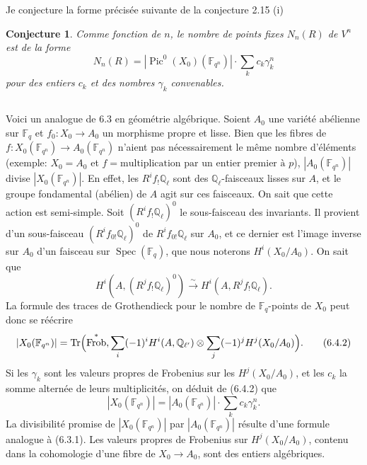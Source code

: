 \documentclass[11pt,a4paper]{article}
\theoremstyle{plain}
\newtheorem{conjecture}[theorem]{Conjecture}
\theoremstyle{definition}
\DeclareMathOperator{\Spec}{Spec}
\DeclareMathOperator{\Pic}{Pic}
\DeclareMathOperator{\Frob}{Frob}
\DeclareMathOperator{\Tr}{Tr}
\newcommand{\Q}{\mathbb{Q}}
\newcommand{\F}{\mathbb{F}}
\begin{document}
Je conjecture la forme pr\'ecis\'ee suivante de la conjecture 2.15 (i)

\begin{conjecture}
Comme fonction de $n$, le nombre de points fixes $N_n(R)$ de $V^n$ est de la forme
\begin{equation}
N_n(R) = |\Pic^0(X_0)(\F_{q^n})| \cdot \sum_k c_k \gamma_k^n
\tag{6.3.1}
\end{equation}
pour des entiers $c_k$ et des nombres $\gamma_k$ convenables.
\end{conjecture}

\subsection{}
Voici un analogue de 6.3 en g\'eom\'etrie alg\'ebrique. Soient $A_0$ une vari\'et\'e ab\'elienne sur $\F_q$ et $f_0: X_0 \to A_0$ un morphisme propre et lisse. Bien que les fibres de $f: X_0(\F_{q^n}) \to A_0(\F_{q^n})$ n'aient pas n\'ecessairement le m\^eme nombre d'\'el\'ements (exemple: $X_0 = A_0$ et $f = \text{multiplication par un entier premier \`a } p$), $|A_0(\F_{q^n})|$ divise $|X_0(\F_{q^n})|$. En effet, les $R^i f_! \Q_\ell$ sont des $\Q_\ell$-faisceaux lisses sur $A$, et le groupe fondamental (ab\'elien) de $A$ agit sur ces faisceaux. On sait que cette action est semi-simple. Soit $(R^i f_! \Q_\ell)^0$ le sous-faisceau des invariants. Il provient d'un sous-faisceau $(R^i f_{0!} \Q_\ell)^0$ de $R^i f_{0!} \Q_\ell$ sur $A_0$, et ce dernier est l'image inverse sur $A_0$ d'un faisceau sur $\Spec(\F_q)$, que nous noterons $H^i(X_0/A_0)$. On sait que
\begin{equation}
H^i(A, (R^j f_! \Q_\ell)^0) \xrightarrow{\sim} H^i(A, R^j f_! \Q_\ell).
\tag{6.4.1}
\end{equation}
La formule des traces de Grothendieck pour le nombre de $\F_q$-points de $X_0$ peut donc se r\'e\'ecrire
\begin{equation}
|X_0(\F_{q^n})| = \Tr\Bigl(\Frob^*, \sum_i (-1)^i H^i(A, \Q_{\ell'}) \otimes \sum_j (-1)^j H^j(X_0/A_0)\Bigr).
\tag{6.4.2}
\end{equation}
Si les $\gamma_k$ sont les valeurs propres de Frobenius sur les $H^j(X_0/A_0)$, et les $c_k$ la somme altern\'ee de leurs multiplicit\'es, on d\'eduit de (6.4.2) que
\begin{equation}
|X_0(\F_{q^n})| = |A_0(\F_{q^n})| \cdot \sum_k c_k \gamma_k^n.
\tag{6.4.3}
\end{equation}
La divisibilit\'e promise de $|X_0(\F_{q^n})|$ par $|A_0(\F_{q^n})|$ r\'esulte d'une formule analogue \`a (6.3.1). Les valeurs propres de Frobenius sur $H^j(X_0/A_0)$, contenu dans la cohomologie d'une fibre de $X_0 \to A_0$, sont des entiers alg\'ebriques.
\end{document}
